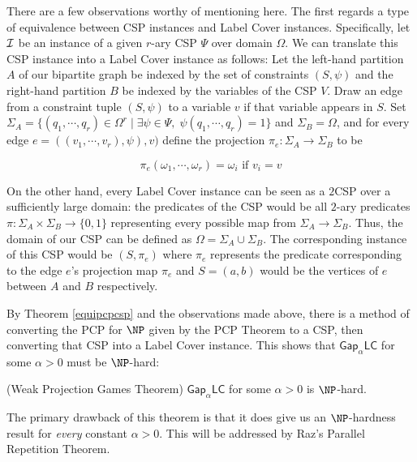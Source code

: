 There are a few observations worthy of mentioning here. The first regards a type of equivalence between CSP instances and Label Cover instances.
%
Specifically, let $\mathcal{I}$ be an instance of a given $r$-ary CSP $\Psi$ over domain $\Omega$. We can translate this CSP instance into a Label Cover instance as follows:
%
Let the left-hand partition $A$ of our bipartite graph be indexed by the set of constraints $(S,\psi)$ and the right-hand partition $B$ be indexed by the variables of the CSP $V$.
%
Draw an edge from a constraint tuple $(S,\psi)$ to a variable $v$ if that variable appears in $S$.
%
Set $\Sigma_A = \{(q_1,\cdots,q_r) \in \Omega^r \mid \exists \psi \in \Psi, \; \psi(q_1,\cdots,q_r) = 1 \}$
%
and $\Sigma_B = \Omega$, and for every edge $e = ((v_1,\cdots,v_r), \psi), v)$ define the projection $\pi_e:\Sigma_A \rightarrow \Sigma_B$ to be

\[ \pi_e(\omega_1, \cdots, \omega_r) =  \omega_i \text{ if } v_i = v\] \newline


On the other hand, every Label Cover instance can be seen as a $2$CSP over a sufficiently large domain: the predicates of the CSP would be all $2$-ary predicates $\pi:\Sigma_A \times \Sigma_B \rightarrow \{0,1\}$ representing every possible map from $\Sigma_A \rightarrow \Sigma_B$. Thus, the domain of our CSP can be defined as $\Omega = \Sigma_A \cup \Sigma_B$. The corresponding instance of this CSP would be $(S,\pi_e)$ where $\pi_e$ represents the predicate corresponding to the edge $e$'s projection map $\pi_e$ and $S = (a,b)$ would be the vertices of $e$ between $A$ and $B$ respectively. \newline

By Theorem \ref{equipcpcsp} and the observations made above, there is a method of converting the PCP for $\NP$ given by the PCP Theorem to a CSP, then converting that CSP into a Label Cover instance. This shows that $\mathsf{Gap}_\alpha\mathsf{LC}$ for some $\alpha > 0$ must be $\NP$-hard:

\begin{theorem} (Weak Projection Games Theorem)
 $\mathsf{Gap}_\alpha\mathsf{LC}$ for some $\alpha > 0$ is $\NP$-hard.
\end{theorem}

The primary drawback of this theorem is that it does give us an $\NP$-hardness result for \emph{every} constant $\alpha > 0$. This will be addressed by Raz's Parallel Repetition Theorem.


